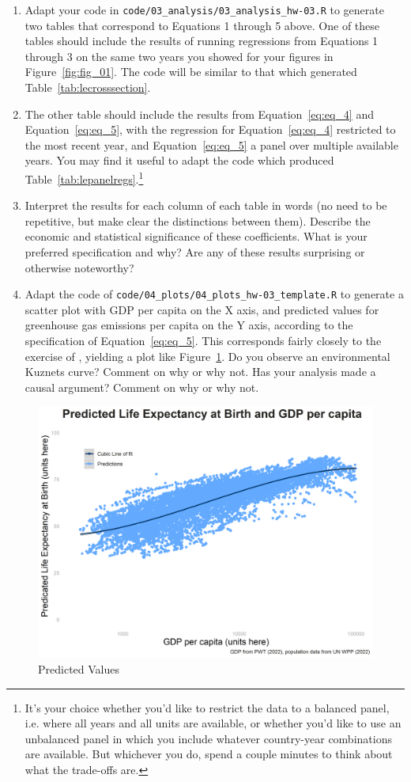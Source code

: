 \begin{enumerate}
    \item Adapt your code in \verb+code/03_analysis/03_analysis_hw-03.R+ to generate two tables that correspond to Equations 1 through 5 above. One of these tables should include the results of running regressions from Equations 1 through 3 on the same two years you showed for your figures in Figure~\ref{fig:fig_01}. The code will be similar to that which generated Table~\ref{tab:lecrosssection}. 
    \item The other table should include the results from Equation~\ref{eq:eq_4} and Equation~\ref{eq:eq_5}, with the regression for Equation~\ref{eq:eq_4} restricted to the most recent year, and Equation~\ref{eq:eq_5} a panel over multiple available years. You may find it useful to adapt the code which produced Table~\ref{tab:lepanelregs}.\footnote{It's your choice whether you'd like to restrict the data to a balanced panel, i.e. where all years and all units are available, or whether you'd like to use an unbalanced panel in which you include whatever country-year combinations are available. But whichever you do, spend a couple minutes to think about what the trade-offs are.}
    \item Interpret the results for each column of each table in words (no need to be repetitive, but make clear the distinctions between them). Describe the economic and statistical significance of these coefficients. What is your preferred specification and why? Are any of these results surprising or otherwise noteworthy? 
    \item Adapt the code of \verb+code/04_plots/04_plots_hw-03_template.R+ to generate a scatter plot with GDP per capita on the X axis, and predicted values for greenhouse gas emissions per capita on the Y axis, according to the specification of Equation~\ref{eq:eq_5}. This corresponds fairly closely to the exercise of \citet{grossmanEconomicGrowthEnvironment1995}, yielding a plot like Figure~\ref{fig:fig4}. Do you observe an environmental Kuznets curve? Comment on why or why not. Has your analysis made a causal argument? Comment on why or why not.
\end{enumerate}

\begin{figure}[H]
	\centering %
	\includegraphics[width=.6\linewidth]{figures/ECON-412/gdp_pc_le_predictions.png}
	\caption{Predicted Values} %
	\label{fig:fig4}
\end{figure}


